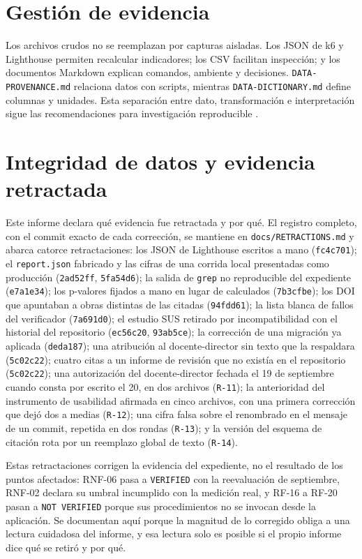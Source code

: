 \documentclass[11pt,a4paper]{report}
\begin{document}
\section{Gestión de evidencia}
Los archivos crudos no se reemplazan por capturas aisladas. Los JSON de k6 y Lighthouse permiten recalcular indicadores; los CSV facilitan inspección; y los documentos Markdown explican comandos, ambiente y decisiones. \texttt{DATA-PROVENANCE.md} relaciona datos con scripts, mientras \texttt{DATA-DICTIONARY.md} define columnas y unidades. Esta separación entre dato, transformación e interpretación sigue las recomendaciones para investigación reproducible \cite{sandve2013ten, ralph2021empirical}.

\section{Integridad de datos y evidencia retractada}
\label{sec:retractaciones}
Este informe declara qué evidencia fue retractada y por qué. El registro completo, con el commit exacto de cada corrección, se mantiene en \texttt{docs/RETRACTIONS.md} y abarca catorce retractaciones: los JSON de Lighthouse escritos a mano (\texttt{fc4c701}); el \texttt{report.json} fabricado y las cifras de una corrida local presentadas como producción (\texttt{2ad52ff}, \texttt{5fa54d6}); la salida de \texttt{grep} no reproducible del expediente (\texttt{e7a1e34}); los p-valores fijados a mano en lugar de calculados (\texttt{7b3cfbe}); los DOI que apuntaban a obras distintas de las citadas (\texttt{94fdd61}); la lista blanca de fallos del verificador (\texttt{7a691d0}); el estudio SUS retirado por incompatibilidad con el historial del repositorio (\texttt{ec56c20}, \texttt{93ab5ce}); la corrección de una migración ya aplicada (\texttt{deda187}); una atribución al docente-director sin texto que la respaldara (\texttt{5c02c22}); cuatro citas a un informe de revisión que no existía en el repositorio (\texttt{5c02c22}); una autorización del docente-director fechada el 19 de septiembre cuando consta por escrito el 20, en dos archivos (\texttt{R-11}); la anterioridad del instrumento de usabilidad afirmada en cinco archivos, con una primera corrección que dejó dos a medias (\texttt{R-12}); una cifra falsa sobre el renombrado en el mensaje de un commit, repetida en dos rondas (\texttt{R-13}); y la versión del esquema de citación rota por un reemplazo global de texto (\texttt{R-14}).

Estas retractaciones corrigen la evidencia del expediente, no el resultado de los puntos afectados: RNF-06 pasa a \texttt{VERIFIED} con la reevaluación de septiembre, RNF-02 declara su umbral incumplido con la medición real, y RF-16 a RF-20 pasan a \texttt{NOT VERIFIED} porque sus procedimientos no se invocan desde la aplicación. Se documentan aquí porque la magnitud de lo corregido obliga a una lectura cuidadosa del informe, y esa lectura solo es posible si el propio informe dice qué se retiró y por qué.
\end{document}
